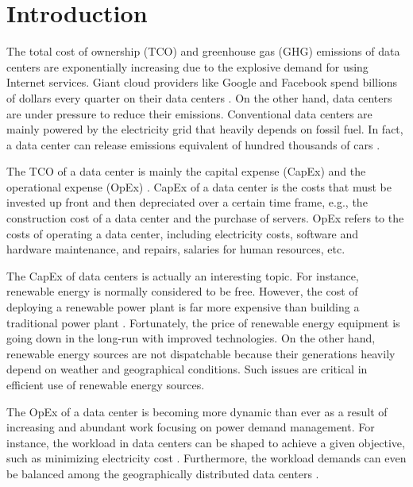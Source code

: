 \section{Introduction}


The total cost of ownership (TCO) and greenhouse gas (GHG) emissions of data centers are exponentially increasing \cite{Rana2010DataCenterInvestment} due to the explosive demand for using Internet services. Giant cloud providers like Google and Facebook spend billions of dollars every quarter on their data centers \cite{sverdlik2015BillionsInDataCenter}. On the other hand, data centers are under pressure to reduce their emissions. Conventional data centers are mainly powered by the electricity grid that heavily depends on fossil fuel. In fact, a data center can release emissions equivalent of hundred thousands of cars \cite{facts2005greenhouse,CarbonFootprints2009}.


The TCO of a data center is mainly the capital expense (CapEx) and the operational expense (OpEx) \cite{barroso2013datacenter}. CapEx of a data center is the costs that must be invested up front and then depreciated over a certain time frame, e.g., the construction cost of a data center and the purchase of servers. OpEx refers to the costs of operating a data center, including electricity costs, software and hardware maintenance, and repairs, salaries for human resources, etc. 

The CapEx of data centers is actually an interesting topic. For instance, renewable energy is normally considered to be free. However, the cost of deploying a renewable power plant is far more expensive than building a traditional power plant \cite{abdmouleh2015review}. Fortunately, the price of renewable energy equipment is going down in the long-run with improved technologies. On the other hand, renewable energy sources are not dispatchable because their generations heavily depend on weather and geographical conditions. Such issues are critical in efficient use of renewable energy sources. 

The OpEx of a data center is becoming more dynamic than ever as a result of increasing and abundant work focusing on power demand management. For instance, the workload in data centers can be shaped to achieve a given objective, such as minimizing electricity cost \cite{urgaonkar2011optimal,pakbaznia2009minimizing}. Furthermore, the workload demands can even be balanced among the geographically distributed data centers \cite{liu2011greening,qureshi2009cutting}.

